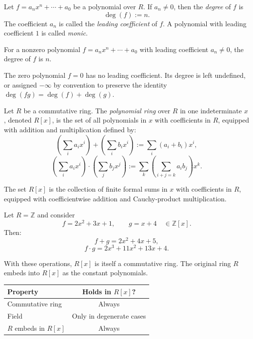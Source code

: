 \begin{definition}[Degree]
\label{def:degree-of-polynomial}
Let $f = a_n x^n + \cdots + a_0$ be a polynomial over $R$.
If $a_n \neq 0$, then the \emph{degree} of $f$ is
\[
\deg(f) := n.
\]
The coefficient $a_n$ is called the \emph{leading coefficient} of $f$.
A polynomial with leading coefficient $1$ is called \emph{monic}.
\end{definition}

\begin{remark*}
For a nonzero polynomial $f=a_nx^n+\cdots+a_0$ with leading coefficient
$a_n\neq 0$, the degree of $f$ is $n$.
\end{remark*}

\begin{remark*}[Interpretation]
The zero polynomial $f = 0$ has no leading coefficient.
Its degree is left undefined, or assigned $-\infty$ by convention
to preserve the identity $\deg(fg) = \deg(f) + \deg(g)$.
\end{remark*}

\begin{definition}
\label{def:polynomial-ring}
Let $R$ be a commutative ring.
The \emph{polynomial ring} over $R$ in one indeterminate $x$,
denoted $R[x]$, is the set of all polynomials in $x$ with
coefficients in $R$, equipped with addition and multiplication
defined by:
\[
\left(\sum_{i} a_i x^i\right) + \left(\sum_{i} b_i x^i\right)
:= \sum_{i} (a_i + b_i) x^i,
\]
\[
\left(\sum_{i} a_i x^i\right) \cdot \left(\sum_{j} b_j x^j\right)
:= \sum_{k} \left(\sum_{i+j=k} a_i b_j\right) x^k.
\]
\end{definition}

\begin{remark*}
The set $R[x]$ is the collection of finite formal sums in $x$ with
coefficients in $R$, equipped with coefficientwise addition and Cauchy-product
multiplication.
\end{remark*}

\begin{example*}
Let $R = \mathbb{Z}$ and consider
\[
f = 2x^2 + 3x + 1, \qquad g = x + 4 \quad \in \mathbb{Z}[x].
\]
Then:
\[
f + g = 2x^2 + 4x + 5,
\]
\[
f \cdot g = 2x^3 + 11x^2 + 13x + 4.
\]
\end{example*}

\begin{remark*}
With these operations, $R[x]$ is itself a commutative ring.
The original ring $R$ embeds into $R[x]$ as the constant polynomials.

\begin{center}
\begin{tabular}{l|c}
Property & Holds in $R[x]$? \\
\hline
Commutative ring & Always \\
Field & Only in degenerate cases \\
$R$ embeds in $R[x]$ & Always
\end{tabular}
\end{center}
\end{remark*}

